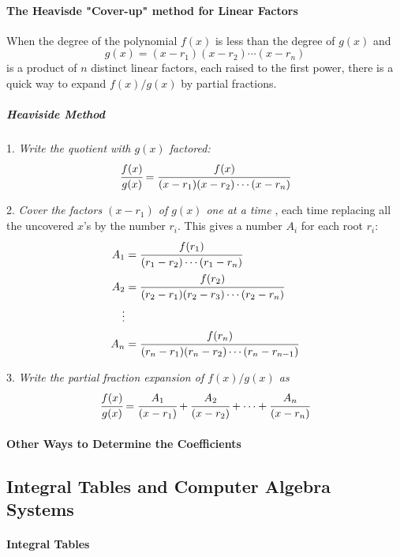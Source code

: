 \documentclass{article}
\begin{document}
            \paragraph{The Heavisde "Cover-up" method for Linear Factors}
                When the degree of the polynomial $f(x)$ is less than the degree of $g(x)$ and
                \[g(x)=(x-r_1)(x-r_2)\cdots(x-r_n)\]
                is a product of $n$ distinct linear factors, each raised to the first power, there is a quick way to expand $f(x)/g(x)$ by partial fractions.
                \subparagraph{Heaviside Method}
                \par 1. \textit{Write the quotient with $g(x)$ factored:}
                \[\cfrac{f(x)}{g(x)}=\cfrac{f(x)}{(x-r_1)(x-r_2)\cdots(x-r_n)}\]
                \par 2. \textit{Cover the factors $(x-r_1)$ of $g(x)$ one at a time }, each time replacing all the uncovered $x$'s by the number $r_i$. This gives a number $A_i$ for each root $r_i$:
                \begin{equation}
                    \begin{aligned}
                        A_1&=\cfrac{f(r_1)}{(r_1-r_2)\cdots(r_1-r_n)}\\
                        A_2&=\cfrac{f(r_2)}{(r_2-r_1)(r_2-r_3)\cdots(r_2-r_n)}\\
                        \vdots\\
                        A_n&=\cfrac{f(r_n)}{(r_n-r_1)(r_n-r_2)\cdots(r_n-r_{n-1})}\\
                    \end{aligned}
                \end{equation}
                \par 3. \textit{Write the partial fraction expansion of $f(x)/g(x)$ as}
                \[\cfrac{f(x)}{g(x)}=\cfrac{A_1}{(x-r_1)}+\cfrac{A_2}{(x-r_2)}+\cdots+\cfrac{A_n}{(x-r_n)}\]
            \paragraph{Other Ways to Determine the Coefficients}
        \subsection{Integral Tables and Computer Algebra Systems}
            \paragraph{Integral Tables}
\end{document}
